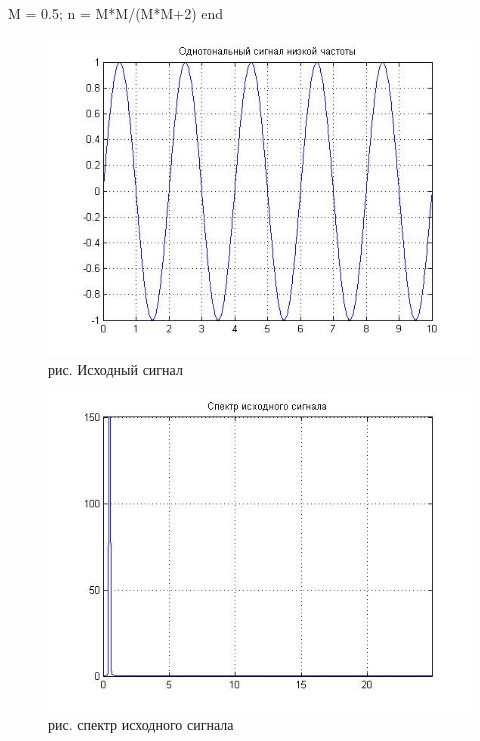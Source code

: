 \documentclass[10pt,a4paper]{report}
\begin{document}
M = 0.5;\newline
n = M*M/(M*M+2)\newline
end

\clearpage
\begin{figure}
\begin{center}
\includegraphics[angle=0, scale = 0.6]{7_1.jpg}\newline
рис. Исходный сигнал\newline
\end{center}
\end{figure}
\begin{figure}
\begin{center}
\includegraphics[angle=0, scale = 0.6]{7_2.jpg}\newline
рис. спектр исходного сигнала\newline
\end{center}
\end{figure}
\end{document}
